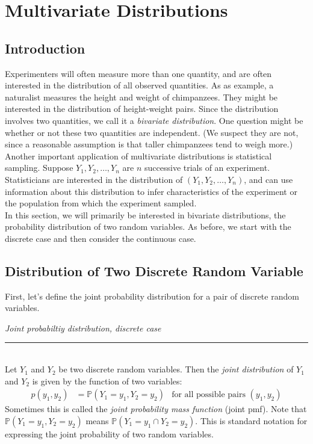 \documentclass[12pt]{article}
\theoremstyle{definition}
\theoremstyle{remark}
\def\P{{\mathbb P}}
\begin{document}
\setcounter{section}{3}
\section{Multivariate Distributions}

\subsection{Introduction}
Experimenters will often measure more than one quantity, and are often interested in the distribution of all observed quantities. As as example, a naturalist measures the height and weight of chimpanzees. They might be interested in the distribution of height-weight pairs. Since the distribution involves two quantities, we call it a \emph{bivariate distribution}. One question might be whether or not these two quantities are independent. (We suspect they are not, since a reasonable assumption is that taller chimpanzees tend to weigh more.)\\

Another important application of multivariate distributions is statistical sampling. Suppose $Y_1, Y_2, \dots, Y_n$ are $n$ successive trials of an experiment. Statisticians are interested in the distribution of $(Y_1, Y_2, \dots, Y_n)$, and can use information about this distribution to infer characteristics of the experiment or the population from which the experiment sampled.\\

In this section, we will primarily be interested in bivariate distributions, the probability distribution of two random variables. As before, we start with the discrete case and then consider the continuous case.

\subsection{Distribution of Two Discrete Random Variable}
First, let's define the joint probability distribution for a pair of discrete random variables.

\begin{framed}
\emph{Joint probabiltiy distribution, discrete case}\\
  \rule{\dimexpr{}\fboxrule}{.1pt} \\
Let $Y_1$ and $Y_2$ be two discrete random variables. Then the \emph{joint distribution} of $Y_1$ and $Y_2$ is given by the function of two variables:
\begin{align*}
p(y_1, y_2) &= \P(Y_1 = y_1, Y_2 = y_2) & \text{for all possible pairs }(y_1, y_2)
\end{align*}
Sometimes this is called the \emph{joint probability mass function} (joint pmf). Note that $\P(Y_1 = y_1, Y_2 = y_2)$ means $\P(Y_1 = y_1 \cap Y_2 = y_2)$. This is standard notation for expressing the joint probability of two random variables. 
\end{framed}
\end{document}
